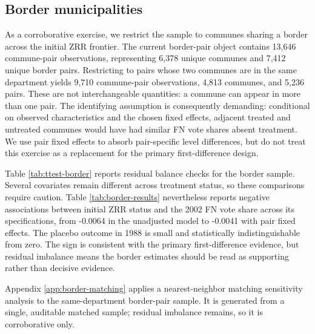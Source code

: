 \subsection{Border municipalities}

As a corroborative exercise, we restrict the sample to communes sharing a border across the initial ZRR frontier. The current border-pair object contains 13,646 commune-pair observations, representing 6,378 unique communes and 7,412 unique border pairs. Restricting to pairs whose two communes are in the same department yields 9,710 commune-pair observations, 4,813 communes, and 5,236 pairs. These are not interchangeable quantities: a commune can appear in more than one pair. The identifying assumption is consequently demanding: conditional on observed characteristics and the chosen fixed effects, adjacent treated and untreated communes would have had similar FN vote shares absent treatment. We use pair fixed effects to absorb pair-specific level differences, but do not treat this exercise as a replacement for the primary first-difference design.

Table \ref{tab:ttest-border} reports residual balance checks for the border sample. Several covariates remain different across treatment status, so these comparisons require caution. Table \ref{tab:border-results} nevertheless reports negative associations between initial ZRR status and the 2002 FN vote share across its specifications, from -0.0064 in the unadjusted model to -0.0041 with pair fixed effects. The placebo outcome in 1988 is small and statistically indistinguishable from zero. The sign is consistent with the primary first-difference evidence, but residual imbalance means the border estimates should be read as supporting rather than decisive evidence.




\begin{landscape}

\end{landscape}


Appendix \ref{app:border-matching} applies a nearest-neighbor matching sensitivity analysis to the same-department border-pair sample. It is generated from a single, auditable matched sample; residual imbalance remains, so it is corroborative only.
